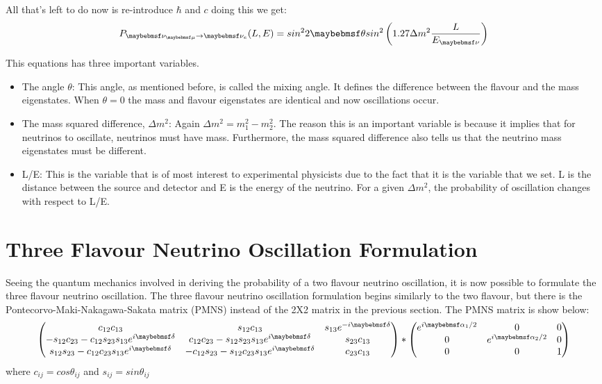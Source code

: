  All that's left to do now is re-introduce $\hbar$ and $c$ doing this we get:
 \begin{equation}
 \centering
 P_{\nu_{\mu} \rightarrow \nu_{e}} (L,E) = sin^{2}2\theta sin^2\left(1.27 \Delta m^2 \frac{L}{E_{\nu}}\right)
 \end{equation}
 
 This equations has three important variables. 
 \begin{itemize}
 \item The angle $\theta$: This angle, as mentioned before, is called the mixing angle. It defines the difference between the flavour and the mass eigenstates. When $\theta = 0$ the mass and flavour eigenstates are identical and now oscillations occur. 
 \item The mass squared difference, $\Delta m^2$: Again $\Delta m^2 = m^2_{1}-m^2_{2}$. The reason this is an important variable is because it implies that for neutrinos to oscillate, neutrinos must have mass. Furthermore, the mass squared difference also tells us that the neutrino mass eigenstates must be different. 
 \item L/E: This is the variable that is of most interest to experimental physicists due to the fact that it is the variable that we set. L is the distance between the source and detector and E is the energy of the neutrino. For a given $\Delta m^2$, the probability of oscillation changes with respect to L/E. 
 \end{itemize}

\section{Three Flavour Neutrino Oscillation Formulation}
Seeing the quantum mechanics involved in deriving the probability of a two flavour neutrino oscillation, it is now possible to formulate the three flavour neutrino oscillation. The three flavour neutrino oscillation formulation begins  similarly to the two flavour, but there is the Pontecorvo-Maki-Nakagawa-Sakata matrix (PMNS) instead of the 2X2 matrix in the previous section. The PMNS matrix is show below:
\begin{equation}
\centering
\begin{pmatrix}
c_{12}c_{13} & s_{12}c_{13} & s_{13}e^{-i \delta} \\
-s_{12}c_{23} - c_{12}s_{23}s_{13}e^{i \delta} & c_{12}c_{23} -s_{12}s_{23}s_{13}e^{i \delta} & s_{23}c_{13}\\
s_{12}s_{23} - c_{12}c_{23}s_{13}e^{i \delta} & -c_{12}s_{23} - s_{12}c_{23}s_{13}e^{i \delta} & c_{23}c_{13}
\end{pmatrix} *
\begin{pmatrix}
e^{i \alpha_{1}/2} & 0 & 0\\
0 & e^{i \alpha_{2}/2} & 0\\
0 & 0 &1
\end{pmatrix}
\end{equation} 
where $c_{ij}=cos\theta_{ij}$ and $s_{ij}=sin\theta_{ij}$

